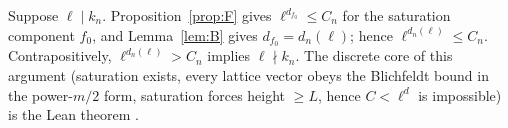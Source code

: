 Suppose $\ell\mid k_n$. Proposition~\ref{prop:F} gives $\ell^{d_{f_0}}\le C_n$ for the saturation component $f_0$, and Lemma~\ref{lem:B} gives $d_{f_0}=d_n(\ell)$; hence $\ell^{d_n(\ell)}\le C_n$. Contrapositively, $\ell^{d_n(\ell)}>C_n$ implies $\ell\nmid k_n$. The discrete core of this argument (saturation exists, every lattice vector obeys the Blichfeldt bound in the power-$m/2$ form, saturation forces height $\ge L$, hence $C<\ell^d$ is impossible) is the Lean theorem .
